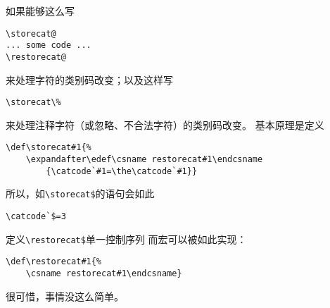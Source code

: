 \documentclass{book}
\begin{document}
如果能够这么写
\begin{verbatim}
\storecat@
... some code ...
\restorecat@
\end{verbatim}
来处理\texttt{\@}字符的类别码改变；以及这样写
\begin{verbatim}
\storecat\%
\end{verbatim}
来处理注释字符（或忽略、不合法字符）的类别码改变。
\alt
基本原理是定义
\begin{verbatim}
\def\storecat#1{%
    \expandafter\edef\csname restorecat#1\endcsname
        {\catcode`#1=\the\catcode`#1}}
\end{verbatim}
所以，如\verb>\storecat$>的语句会如此
\begin{verbatim}
\catcode`$=3
\end{verbatim}
定义\verb-\restorecat$-单一控制序列
而宏可以被如此实现：
\begin{verbatim}
\def\restorecat#1{%
    \csname restorecat#1\endcsname}
\end{verbatim}
很可惜，事情没这么简单。
\end{document}
